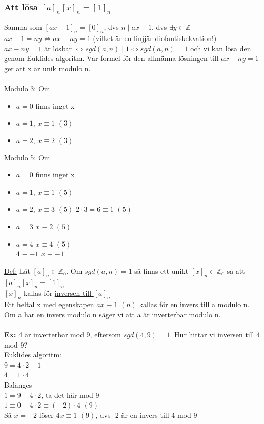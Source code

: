\documentclass{article}
\begin{document}
    \subsubsection{Att lösa $[a]_{n}[x]_{n}=[1]_{n}$}
    Samma som $[ax-1]_{n}=[0]_{n}$, dvs $n\mid ax-1$, dvs $\exists y\in \mathbb{Z}$\\
    $ax-1=ny\Leftrightarrow ax-ny=1$ (vilket är en linjjär diofantiskekvation!)\\
    $ax-ny=1$ är lösbar $\Leftrightarrow sgd(a,n)\mid 1\Leftrightarrow sgd(a,n)=1$ och vi kan lösa den genom Euklides algoritm. 
    Vår formel för den allmänna lösningen till $ax-ny=1$ ger att x är unik modulo n.\\\\
    \underline{Modulo 3:} Om
    \begin{itemize}
        \item $a=0$ finns inget x
        \item $a=1$, $x\equiv 1$ $(3)$
        \item $a=2$, $x\equiv 2$ $(3)$
    \end{itemize}
    \underline{Modulo 5:} Om
    \begin{itemize}
        \item $a=0$ finns inget x
        \item $a=1$, $x\equiv 1$ $(5)$
        \item $a=2$, $x\equiv 3$ $(5)$ $2\cdot 3=6\equiv 1$ $(5)$
        \item $a=3$ $x\equiv 2$ $(5)$
        \item $a=4$ $x\equiv 4$ $(5)$\\
                $4\equiv -1$ $x\equiv -1$
    \end{itemize}
    \underline{Def:} Låt $[a]_{n}\in \mathbb{Z_{n}}$. Om $sgd(a,n)=1$ så finns ett unikt $[x]_{n}\in \mathbb{Z_{n}}$ så att $[a]_{n}[x]_{n}=[1]_{n}$\\
    $[x]_{n}$ kallas för \underline{inversen till $[a]_{n}$}\\
    Ett heltal x med egenskapen $ax\equiv 1$ $(n)$ kallas för en \underline{invers till a modulo n}. 
    Om a har en invers modulo n säger vi att a är \underline{inverterbar modulo n}.\\\\
    \underline{\textbf{Ex:}} 4 är inverterbar mod 9, eftersom $sgd(4,9)=1$. Hur hittar vi inversen till 4 mod 9?\\
    \indent \underline{Euklides algoritm:}\\
    \indent $9=4\cdot 2+1$\\
    \indent $4=1\cdot 4$\\
    \indent Balänges\\
    \indent $1=9-4\cdot 2$, ta det här mod 9\\
    \indent $1\equiv 0-4\cdot 2\equiv (-2)\cdot 4$ $(9)$\\
    Så $x=-2$ löser $4x\equiv 1$ $(9)$, dvs -2 är en invers till 4 mod 9
\end{document}
